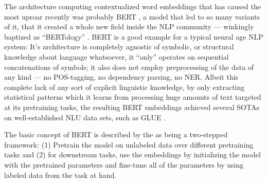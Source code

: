 The architecture computing contextualized word embeddings that has caused the most uproar
recently was probably BERT \cite{devlin2018bert}, a model that led to so many variants of
it, that it created a whole new field inside the NLP community --- winkingly baptized as
``BERTology'' \cite{rogers2020primer}. BERT is a good example for a typical neural age NLP
system: It's architecture is completely agnostic of symbolic, or structural knowledge about
language whatsoever, it ``only'' operates on sequential concatenations of symbols; it also
does not employ preprocessing of the data of any kind --- no POS-tagging, no dependency
parsing, no NER. Albeit this complete lack of any sort of explicit linguistic knowledge,
by only extracting statistical patterns which it learns from processing huge amounts of
text targeted at its pretraining tasks, the resulting BERT embeddings achieved several
SOTAs on well-established NLU data sets, such as GLUE \cite{wang2018glue}.


The basic concept of BERT is described by the \citeauthor{devlin2018bert} as
being a two-stepped framework: (1) Pretrain the model on unlabeled data over
different pretraining tasks and (2) for downstream tasks, use the embeddings by initializing
the model with the pretrained parameters and fine-tune all of the parameters
by using labeled data from the task at hand.

